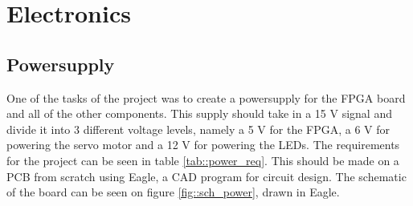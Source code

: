 \section{Electronics}
\subsection{Powersupply}
One of the tasks of the project was to create a powersupply for the FPGA board and all of the other components. This supply should take in a 15 V signal and divide it into 3  different voltage levels, namely a 5 V for the FPGA, a 6 V for powering the servo motor and a 12 V for powering the LEDs. The requirements for the project can be seen in table \ref{tab::power_req}. This should be made on a PCB from scratch using Eagle, a CAD program for circuit design. The schematic of the board can be seen on figure \ref{fig::sch_power}, drawn in Eagle.

